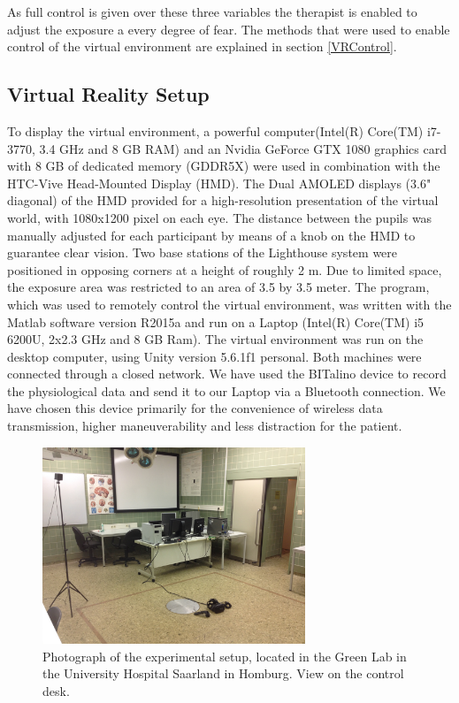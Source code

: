 As full control is given over these three variables the therapist is enabled to adjust the exposure a every degree of fear. 
The methods that were used to enable control of the virtual environment are explained in section \ref{VRControl}.

\subsection{Virtual Reality Setup}
To display the virtual environment, a powerful computer(Intel(R) Core(TM) i7-3770, 3.4 GHz and 8 GB RAM) and an Nvidia GeForce GTX 1080 graphics card with 8 GB of dedicated memory (GDDR5X) were used in combination with the HTC-Vive Head-Mounted Display (HMD). The Dual AMOLED displays (3.6" diagonal) of the HMD provided for a high-resolution presentation of the virtual world, with 1080x1200 pixel on each eye. The distance between the pupils was manually adjusted for each participant by means of a knob on the HMD to guarantee clear vision. 
Two base stations of the Lighthouse system were positioned in opposing corners at a height of roughly 2 m. Due to limited space, the exposure area was restricted to an area of 3.5 by 3.5 meter. The program, which was used to remotely control the virtual environment, was written with the Matlab software version R2015a and run on a Laptop (Intel(R) Core(TM) i5 6200U, 2x2.3 GHz and 8 GB Ram). The virtual environment was run on the desktop computer, using Unity version 5.6.1f1 personal. Both machines were connected through a closed network. We have used the BITalino device to record the physiological data and send it to our Laptop via a Bluetooth connection. We have chosen this device primarily for the convenience of wireless data transmission, higher maneuverability and less distraction for the patient. 

\begin{figure}[H]
\centering
\includegraphics[width=0.7\textwidth]{images/IMG_5311.JPG}
\caption{Photograph of the experimental setup, located in the Green Lab in the University Hospital Saarland in Homburg. View on the control desk.}
\label{SetupVRImg}
\end{figure}

